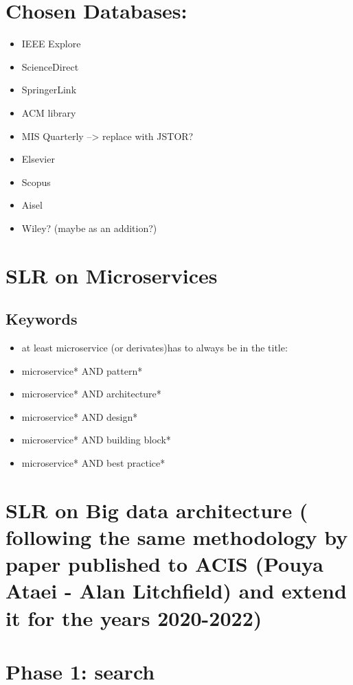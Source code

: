 \documentclass{article}
\theoremstyle{mytheoremstyle}
\theoremstyle{mytheoremstyle}
\theoremstyle{myproblemstyle}
\begin{document}
    \section{Chosen Databases:}
    \begin{itemize}
        \item IEEE Explore
        \item ScienceDirect
        \item SpringerLink
        \item ACM library
        \item MIS Quarterly --> replace with JSTOR?
        \item Elsevier
        \item Scopus
        \item Aisel
        \item Wiley? (maybe as an addition?)
    \end{itemize}

    \section{SLR on Microservices }
    \subsection{Keywords}
    \begin{itemize}
    	\item at least microservice (or derivates)has to always be in the title:
        \item microservice* AND pattern* 
        \item microservice* AND architecture*
        \item microservice* AND design*
        \item microservice* AND building block*
        \item microservice* AND best practice*
    \end{itemize}

    \section{ SLR on Big data architecture ( following the same methodology by paper published to ACIS (Pouya Ataei - Alan Litchfield) and extend it for the years 2020-2022) }


    \section{Phase 1: search}
\end{document}
